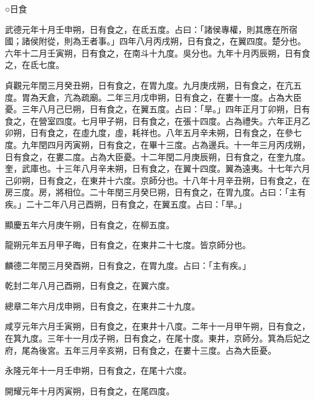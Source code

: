 
\begin{pinyinscope}

 ○日食



 武德元年十月壬申朔，日有食之，在氐五度。占曰：「諸侯專權，則其應在所宿國；諸侯附從，則為王者事。」四年八月丙戌朔，日有食之，在翼四度。楚分也。六年十二月壬寅朔，日有食之，在南斗十九度。吳分也。九年十月丙辰朔，日有食之，在氐七度。



 貞觀元年閏三月癸丑朔，日有食之，在胃九度。九月庚戌朔，日有食之，在亢五度。胃為天倉，亢為疏廟。二年三月戊申朔，日有食之，在婁十一度。占為大臣憂。三年八月己巳朔，日有食之，在翼五度。占曰：「旱。」四年正月丁卯朔，日有食之，在營室四度。七月甲子朔，日有食之，在張十四度。占為禮失。六年正月乙卯朔，日有食之，在虛九度，虛，耗祥也。八年五月辛未朔，日有食之，在參七度。九年閏四月丙寅朔，日有食之，在畢十三度。占為邊兵。十一年三月丙戌朔，日有食之，在婁二度。占為大臣憂。十二年閏二月庚辰朔，日有食之，在奎九度。奎，武庫也。十三年八月辛未朔，日有食之，在翼十四度。翼為遠夷。十七年六月己卯朔，日有食之，在東井十六度。京師分也。十八年十月辛丑朔，日有食之，在房三度。房，將相位。二十年閏三月癸巳朔，日有食之，在胃九度。占曰：「主有疾。」二十二年八月己酉朔，日有食之，在翼五度。占曰：「旱。」



 顯慶五年六月庚午朔，日有食之，在柳五度。



 龍朔元年五月甲子晦，日有食之，在東井二十七度。皆京師分也。



 麟德二年閏三月癸酉朔，日有食之，在胃九度。占曰：「主有疾。」



 乾封二年八月己酉朔，日有食之，在翼六度。



 總章二年六月戊申朔，日有食之，在東井二十九度。



 咸亨元年六月壬寅朔，日有食之，在東井十八度。二年十一月甲午朔，日有食之，在箕九度。三年十一月戊子朔，日有食之，在尾十度。東井，京師分。箕為后妃之府，尾為後宮。五年三月辛亥朔，日有食之，在婁十三度。占為大臣憂。



 永隆元年十一月壬申朔，日有食之，在尾十六度。



 開耀元年十月丙寅朔，日有食之，在尾四度。




\end{pinyinscope}
